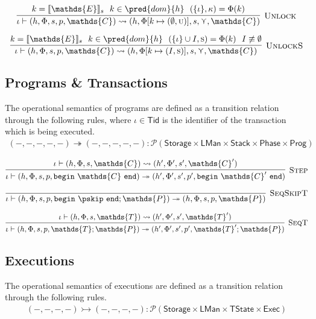 \[
\infer[\textsc{Unlock}]
{
	\iota \vdash (h, \Phi, s, p, \mathds{C})
	\rightsquigarrow
	(h, \Phi[k \mapsto (\emptyset, \textsc{u})], s, \curlyvee, \mathds{C})
}
{
	k = \llbracket \mathds{E} \rrbracket_s\ \
	k \in \pred{dom}{h}\ \
	(\{\iota\}, \kappa) = \Phi(k)
}
\]

\[
\infer[\textsc{UnlockS}]
{
	\iota \vdash (h, \Phi, s, p, \mathds{C})
	\rightsquigarrow
	(h, \Phi[k \mapsto (I, \textsc{s})], s, \curlyvee, \mathds{C})
}
{
	k = \llbracket \mathds{E} \rrbracket_s\ \
	k \in \pred{dom}{h}\ \
	(\{\iota\} \cup I, \textsc{s}) = \Phi(k)\ \
	I \not\equiv \emptyset
}
\]

\subsection{Programs \& Transactions}
The operational semantics of programs are defined as a transition relation through the following rules, where $\iota \in \mathsf{Tid}$ is the identifier of the transaction which is being executed.
\begin{gather*}
(-, -, -, -, -) \twoheadrightarrow (-, -, -, -, -) : \mathcal{P}(\mathsf{Storage} \times \mathsf{LMan} \times \mathsf{Stack} \times \mathsf{Phase} \times \mathsf{Prog})
\end{gather*}

\[
\infer[\textsc{Step}]
{
	\iota \vdash (h, \Phi, s, p, \mathtt{begin}\ \mathds{C}\ \mathtt{end})
	\twoheadrightarrow
	(h', \Phi', s', p', \mathtt{begin}\ \mathds{C}'\ \mathtt{end})
}
{
	\iota \vdash (h, \Phi, s, \mathds{C})
	\rightsquigarrow
	(h', \Phi', s', \mathds{C}')
}
\]

\[
\infer[\textsc{SeqSkipT}]
{
	\iota \vdash (h, \Phi, s, p, \mathtt{begin}\ \pskip\ \mathtt{end}; \mathds{P})
	\twoheadrightarrow
	(h, \Phi, s, p, \mathds{P})
}
{}
\]

\[
\infer[\textsc{SeqT}]
{
	\iota \vdash (h, \Phi, s, p, \mathds{T}; \mathds{P})
	\twoheadrightarrow
	(h', \Phi', s', p', \mathds{T}'; \mathds{P})
}
{
	\iota \vdash (h, \Phi, s, \mathds{T})
	\rightsquigarrow
	(h', \Phi', s', \mathds{T}')
}
\]

\subsection{Executions}

The operational semantics of executions are defined as a transition relation through the following rules.
\begin{gather*}
(-, -, -, -) \rightarrowtail (-, -, -, -) 
: \mathcal{P}(\mathsf{Storage} \times \mathsf{LMan} \times \mathsf{TState} \times \mathsf{Exec})
\end{gather*}

